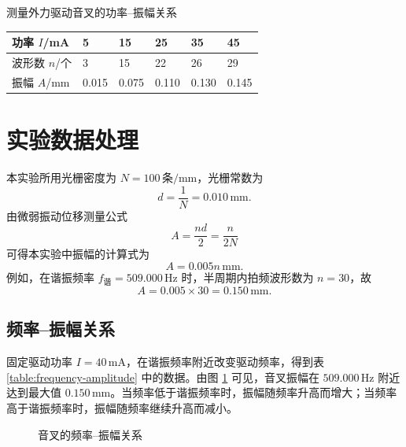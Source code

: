 \documentclass{../template/myrpt}
\begin{document}
\begin{LabRecordTable}
  \centering
  \caption{测量外力驱动音叉的功率--振幅关系}
  \label{table:power-amplitude}
  \renewcommand{\arraystretch}{1.35}
  \setlength{\tabcolsep}{4pt}
  \small
  \begin{tabularx}{\textwidth}{C{2.4cm} *{5}{Y}}
    \toprule
    功率 $I$/\si{\milli\ampere} & 5 & 15 & 25 & 35 & 45 \\
    \midrule
    波形数 $n$/个 & 3 & 15 & 22 & 26 & 29 \\
    振幅 $A$/\si{\milli\metre} & 0.015 & 0.075 & 0.110 & 0.130 & 0.145 \\
    \bottomrule
  \end{tabularx}
\end{LabRecordTable}

\section{实验数据处理}

本实验所用光栅密度为 $N=100\,\text{条}/\si{\milli\metre}$，光栅常数为
\[
  d=\frac{1}{N}=0.010\,\si{\milli\metre}.
\]
由微弱振动位移测量公式
\[
  A=\frac{nd}{2}=\frac{n}{2N}
\]
可得本实验中振幅的计算式为
\[
  A=0.005n\,\si{\milli\metre}.
\]
例如，在谐振频率 $f_{\text{谐}}=509.000\,\si{\hertz}$ 时，半周期内拍频波形数为 $n=30$，故
\[
  A=0.005\times 30=0.150\,\si{\milli\metre}.
\]

\subsection{频率--振幅关系}

固定驱动功率 $I=40\,\si{\milli\ampere}$，在谐振频率附近改变驱动频率，得到表 \ref{table:frequency-amplitude} 中的数据。由图 \ref{fig:frequency-amplitude} 可见，音叉振幅在 $509.000\,\si{\hertz}$ 附近达到最大值 $0.150\,\si{\milli\metre}$。当频率低于谐振频率时，振幅随频率升高而增大；当频率高于谐振频率时，振幅随频率继续升高而减小。

\begin{figure}[htbp]
  \centering
  \caption{音叉的频率--振幅关系}
  \label{fig:frequency-amplitude}
\end{figure}
\end{document}
